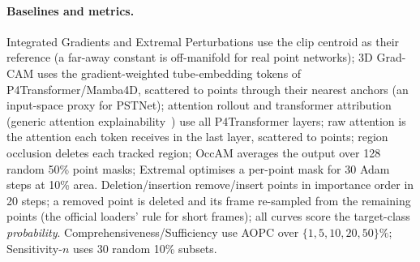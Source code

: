 \paragraph{Baselines and metrics.}
Integrated Gradients and Extremal Perturbations use the clip centroid as their reference (a far-away constant is off-manifold for real point networks); 3D Grad-CAM uses the gradient-weighted tube-embedding tokens of P4Transformer/Mamba4D, scattered to points through their nearest anchors (an input-space proxy for PSTNet); attention rollout and transformer attribution (generic attention explainability~\cite{chefer2021transformer}) use all P4Transformer layers; raw attention is the attention each token receives in the last layer, scattered to points; region occlusion deletes each tracked region; OccAM averages the output over 128 random 50\% point masks; Extremal optimises a per-point mask for 30 Adam steps at 10\% area. Deletion/insertion remove/insert points in importance order in 20 steps; a removed point is deleted and its frame re-sampled from the remaining points (the official loaders' rule for short frames); all curves score the target-class \emph{probability}. Comprehensiveness/Sufficiency use AOPC over $\{1,5,10,20,50\}\%$; Sensitivity-$n$ uses 30 random 10\% subsets.
